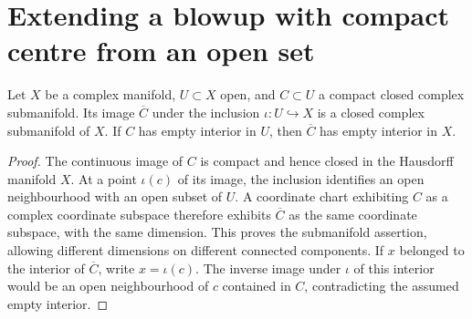 \section{Extending a blowup with compact centre from an open set}

\begin{lemma}
\label{hir:compact-open-centre-ambient}
\leanok
Let $X$ be a complex manifold, $U\subset X$ open, and $C\subset U$ a compact closed complex submanifold. Its image $\overline C$ under the inclusion $\iota:U\hookrightarrow X$ is a closed complex submanifold of $X$. If $C$ has empty interior in $U$, then $\overline C$ has empty interior in $X$.
\end{lemma}
\begin{proof}
The continuous image of $C$ is compact and hence closed in the Hausdorff manifold $X$. At a point $\iota(c)$ of its image, the inclusion identifies an open neighbourhood with an open subset of $U$. A coordinate chart exhibiting $C$ as a complex coordinate subspace therefore exhibits $\overline C$ as the same coordinate subspace, with the same dimension. This proves the submanifold assertion, allowing different dimensions on different connected components. If $x$ belonged to the interior of $\overline C$, write $x=\iota(c)$. The inverse image under $\iota$ of this interior would be an open neighbourhood of $c$ contained in $C$, contradicting the assumed empty interior.
\end{proof}

